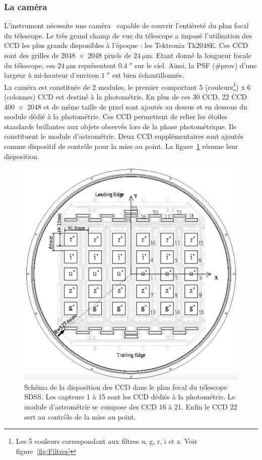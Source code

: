 \subsubsection{La caméra}
L'instrument nécessite une caméra~\cite{Gunn1998} capable de couvrir l'entièreté du plan focal du télescope. Le très grand champ de vue du télescope a imposé l'utilisation des CCD les plus grands disponibles à l'époque : les Tektronix Tk2048E. Ces CCD sont des grilles de \num{2048x2048} pixels de $\SI{24}{\micro\meter}$. Etant donné la longueur focale du télescope, ces $\SI{24}{\micro\meter}$ représentent $\SI{0,4}{\arcsecond}$ sur le ciel. Ainsi, la PSF (\#prov) d'une largeur à mi-hauteur d'environ $\SI{1}{\arcsecond}$ est bien échantillonnée. \\
La caméra est constituée de 2 modules, le premier comportant 5 (couleurs\footnote{Les 5 couleurs correspondant aux filtres u, g, r, i et z. Voir figure~\ref{fig:Filtres}}) x 6 (colonnes) CCD est destiné à la photométrie. En plus de ces 30 CCD, 22 CCD \num{400x2048} et de même taille de pixel sont ajoutés au dessus et en dessous du module dédié à la photométrie. Ces CCD permettent de relier les étoiles standards brillantes aux objets observés lors de la phase photométrique. Ils constituent le module d'astrométrie. Deux CCD supplémentaires sont ajoutés comme dispositif de contrôle pour la mise au point. La figure~\ref{fig:CcdSchema} résume leur disposition.
\begin{figure}
  \centering
  \includegraphics[scale=0.3]{CcdSchema}
  \caption{Schéma de la disposition des CCD dans le plan focal du télescope SDSS. Les capteurs 1 à 15 sont les CCD dédiés à la photométrie. Le module d'astrométrie se compose des CCD 16 à 21. Enfin le CCD 22 sert au contrôle de la mise au point.}
  \label{fig:CcdSchema}
\end{figure}

